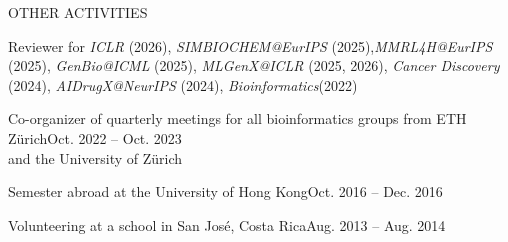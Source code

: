 \documentclass{resume} %
\begin{document}
\begin{rSection}{OTHER ACTIVITIES}
\vspace{-1.25em}
\item Reviewer for \textit{ICLR} (2026), \textit{SIMBIOCHEM@EurIPS} (2025),\textit{MMRL4H@EurIPS} (2025), \textit{GenBio@ICML} (2025), \textit{MLGenX@ICLR} (2025, 2026), \textit{Cancer Discovery} (2024), \textit{AIDrugX@NeurIPS} (2024), \textit{Bioinformatics}(2022)
\item Co-organizer of quarterly meetings for all bioinformatics groups from ETH Zürich\hfill {Oct. 2022 -- Oct. 2023}\\ and the University of Zürich
\item Semester abroad at the University of Hong Kong\hfill {Oct. 2016 -- Dec. 2016}
\item Volunteering at a school in San José, Costa Rica\hfill {Aug. 2013 -- Aug. 2014}
\end{rSection} 

\nocite{ahlmann2026representation,barkmann2025cansig,ciernik2023ans,prummer2023scroshi,barkmann2023superiorization,ovcharenko2025scsslbench,theus2024cancerfoundation,vandenhirtz2024sctree,pedrocchi2025sparse,kraft2025cdstate}
\end{document}
